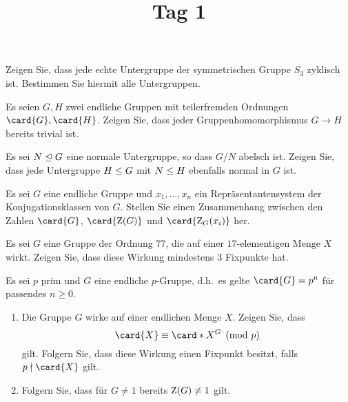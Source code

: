 \documentclass[a4paper, 10pt]{scrartcl}
\title{Tag 1}
\author{}
\date{}
\begin{document}
\begin{question}
  Zeigen Sie, dass jede echte Untergruppe der symmetrischen Gruppe $S_3$ zyklisch ist.
  Bestimmen Sie hiermit alle Untergruppen.
\end{question}

\begin{question}
  Es seien $G, H$ zwei endliche Gruppen mit teilerfremden Ordnungen $\card{G}, \card{H}$.
  Zeigen Sie, dass jeder Gruppenhomomorphismus $G \to H$ bereits trivial ist.
\end{question}

\begin{question}
  Es sei $N \mathrel{\trianglelefteq} G$ eine normale Untergruppe, so dass $G/N$ abelsch ist.
  Zeigen Sie, dass jede Untergruppe $H \mathrel{\leq} G$ mit $N \mathrel{\leq} H$ ebenfalls normal in $G$ ist.
\end{question}


\begin{question}
  Es sei $G$ eine endliche Gruppe und $x_1, \dotsc, x_n$ ein Repräsentantensystem der Konjugationsklassen von $G$.
  Stellen Sie einen Zusammenhang zwischen den Zahlen $\card{G}$, $\card{\groupcenter{G}}$ und $\card{\centralizer{G}{x_i}}$ her.
\end{question}

\begin{question}
  Es sei $G$ eine Gruppe der Ordnung $77$, die auf einer $17$-elementigen Menge $X$ wirkt.
  Zeigen Sie, dass diese Wirkung mindestens $3$ Fixpunkte hat.
\end{question}

\begin{question}
  Es sei $p$ prim und $G$ eine endliche $p$-Gruppe, d.h.\ es gelte $\card{G} = p^n$ für passendes $n \geq 0$.
  \begin{enumerate}
    \item
      Die Gruppe $G$ wirke auf einer endlichen Menge $X$.
      Zeigen Sie, dass
      \[
                \card{X}
        \equiv  \card*{X^G}
        \pmod{p}
      \]
      gilt.
      Folgern Sie, dass diese Wirkung einen Fixpunkt besitzt, falls $p \notdivides \card{X}$ gilt.
    \item
      Folgern Sie, dass für $G \neq 1$ bereits $\operatorname{Z}(G) \neq 1$ gilt.
  \end{enumerate}
\end{question}
\end{document}
